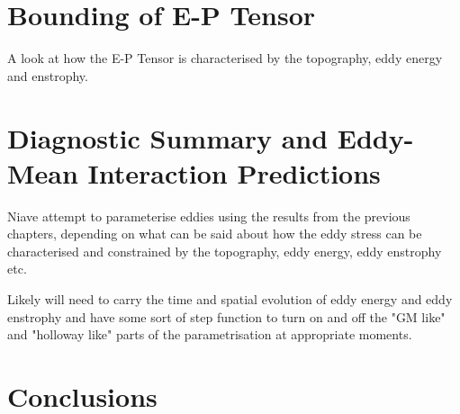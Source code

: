 \documentclass[10pt,a4paper]{article}
\begin{document}
\section{Bounding of E-P Tensor}

A look at how the E-P Tensor is characterised by
the topography, eddy energy and enstrophy.

\section{Diagnostic Summary and Eddy-Mean Interaction Predictions}

Niave attempt to parameterise eddies using the 
results from the previous chapters, depending
on what can be said about how the eddy stress can
be characterised and constrained by the topography,
eddy energy, eddy enstrophy etc. 

Likely will need to carry the time and spatial
evolution of eddy energy and eddy enstrophy and have
some sort of step function to turn on and off the
"GM like" and "holloway like" parts of the parametrisation at appropriate moments.

\section{Conclusions}
\end{document}

